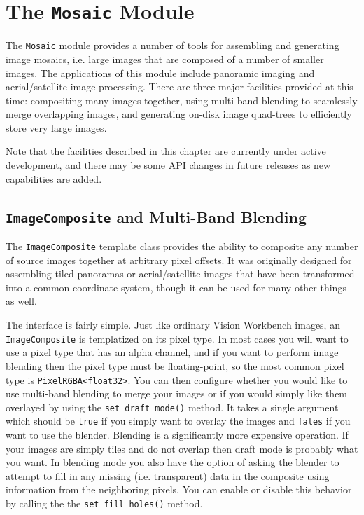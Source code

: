 \chapter{The {\tt Mosaic} Module}\label{ch:mosaic-module}

The \verb#Mosaic# module provides a number of tools for assembling and
generating image mosaics, i.e. large images that are composed of a
number of smaller images.  The applications of this module include
panoramic imaging and aerial/satellite image processing.  There are 
three major facilities provided at this time: compositing many images 
together, using multi-band blending to seamlessly merge overlapping 
images, and generating on-disk image quad-trees to efficiently store 
very large images.

Note that the facilities described in this chapter are currently under
active development, and there may be some API changes in future
releases as new capabilities are added.

\section{{\tt ImageComposite} and Multi-Band Blending}\label{sec:imagecomposite}

The \verb#ImageComposite# template class provides the ability to
composite any number of source images together at arbitrary pixel
offsets.  It was originally designed for assembling tiled panoramas or
aerial/satellite images that have been transformed into a common
coordinate system, though it can be used for many other things as
well.

The interface is fairly simple.  Just like ordinary Vision Workbench
images, an \verb#ImageComposite# is templatized on its pixel type.  In
most cases you will want to use a pixel type that has an alpha
channel, and if you want to perform image blending then the pixel type
must be floating-point, so the most common pixel type is
\verb#PixelRGBA<float32>#.  You can then configure whether you would
like to use multi-band blending to merge your images or if you would
simply like them overlayed by using the \verb#set_draft_mode()#
method.  It takes a single argument which should be \verb#true# if you
simply want to overlay the images and \verb#fales# if you want to use
the blender.  Blending is a significantly more expensive operation.
If your images are simply tiles and do not overlap then draft mode is
probably what you want.  In blending mode you also have the option of
asking the blender to attempt to fill in any missing
(i.e. transparent) data in the composite using information from the
neighboring pixels.  You can enable or disable this behavior by
calling the the \verb#set_fill_holes()# method.

